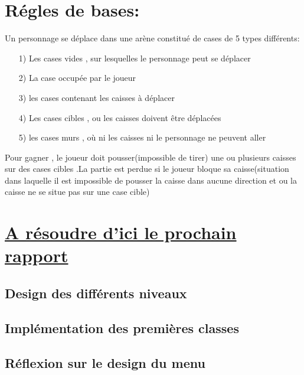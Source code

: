 \documentclass{article}
\begin{document}
\section{Régles de bases:}

Un personnage se déplace dans une arène constitué de cases de 5 types différents:
\begin{itemize}

\item[1) Les cases vides , sur lesquelles le personnage peut se déplacer]
\item[2) La case occupée par le joueur]
\item[3) les cases contenant les caisses à déplacer]
\item[4) Les cases cibles , ou les caisses doivent être déplacées]
\item[5) les cases murs , où ni les caisses ni le personnage ne peuvent aller ]
\end{itemize}
\vspace{0.5cm}
Pour gagner , le joueur doit pousser(impossible de tirer) une ou plusieurs caisses sur des cases cibles .La partie est perdue si le joueur bloque sa caisse(situation dans laquelle il est impossible de pousser la caisse dans aucune direction et ou la caisse ne se situe pas sur une case cible)


\section{\underline{A résoudre d'ici le prochain rapport}}
\subsection{Design des différents niveaux}
\subsection{Implémentation des premières classes}
\subsection{Réflexion sur le design du menu}


\newpage
\end{document}
